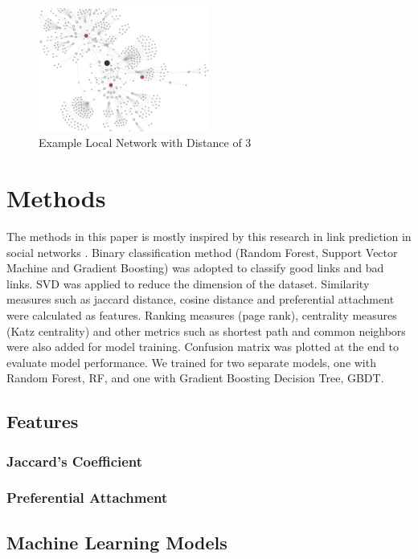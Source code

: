 \documentclass[9pt,twoside]{pnas-new}
\begin{document}
\begin{figure}[ht]
    \centering
    \includegraphics[width=0.5\textwidth]{Figures/local_network_example.png}
    \caption{Example Local Network with Distance of 3}
    \label{fig:localnetwork}
\end{figure}


\section*{Methods}
The methods in this paper is mostly inspired by this research in link prediction in social networks \cite{6033365}. Binary classification method (Random Forest, Support Vector Machine and Gradient Boosting) was adopted to classify good links and bad links. SVD was applied to reduce the dimension of the dataset. Similarity measures such as jaccard distance, cosine distance and preferential attachment were calculated as features. Ranking measures (page rank), centrality measures (Katz centrality) and other metrics such as shortest path and common neighbors were also added for model training. Confusion matrix was plotted at the end to evaluate model performance. We trained for two separate models, one with Random Forest, RF, and one with Gradient Boosting Decision Tree, GBDT. 
\subsection*{Features}\cite{sadraei}

\subsubsection*{Jaccard's Coefficient}

\subsubsection*{Preferential Attachment}

\subsection*{Machine Learning Models}



\showacknow %


\end{document}
